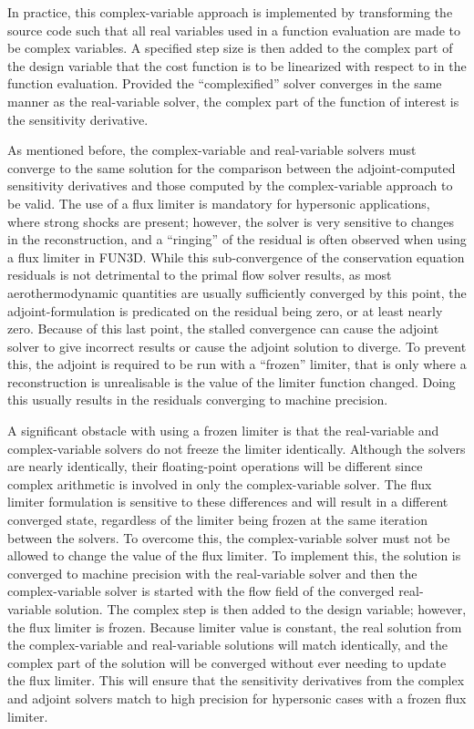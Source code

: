 In practice, this complex-variable approach is implemented by transforming the
source code such that all real variables used in a function evaluation are made
to be complex variables.  A specified step size is then added to the complex
part of the design variable that the cost function is to be linearized with
respect to in the function evaluation.  Provided the ``complexified'' solver
converges in the same manner as the real-variable solver, the complex part of
the function of interest is the sensitivity derivative.

As mentioned before, the complex-variable and real-variable solvers must
converge to the same solution for the comparison between the adjoint-computed
sensitivity derivatives and those computed by the complex-variable approach to
be valid.  The use of a flux limiter is mandatory for hypersonic applications,
where strong shocks are present; however, the solver is very sensitive to
changes in the reconstruction, and a ``ringing'' of the residual is often
observed\cite{gnoffo2007ringing} when using a flux limiter in FUN3D. While this
sub-convergence of the conservation equation residuals is not detrimental to the
primal flow solver results, as most aerothermodynamic quantities are usually
sufficiently converged by this point, the adjoint-formulation is predicated on
the residual being zero, or at least nearly zero.  Because of this last point,
the stalled convergence can cause the adjoint solver to give incorrect results
or cause the adjoint solution to diverge.  To prevent this, the adjoint is
required to be run with a ``frozen'' limiter, that is only where a
reconstruction is unrealisable is the value of the limiter function changed.
 Doing this usually results in the residuals converging to machine precision.

A significant obstacle with using a frozen limiter is that the real-variable and
complex-variable solvers do not freeze the limiter identically.  Although the
solvers are nearly identically, their floating-point operations will be
different since complex arithmetic is involved in only the complex-variable
solver.  The flux limiter formulation is sensitive to these differences and will
result in a different converged state, regardless of the limiter being frozen
at the same iteration between the solvers.  To overcome this, the
complex-variable solver must not be allowed to change the value of the flux
limiter.  To implement this, the solution is converged to machine precision with
the real-variable solver and then the complex-variable solver is started with
the flow field of the converged real-variable solution.  The complex step is
then added to the design variable; however, the flux limiter is frozen.  Because
limiter value is constant, the real solution from the complex-variable and
real-variable solutions will match identically, and the complex part of the
solution will be converged without ever needing to update the flux limiter.
This will ensure that the sensitivity derivatives from the complex and adjoint
solvers match to high precision for hypersonic cases with a frozen flux limiter.

